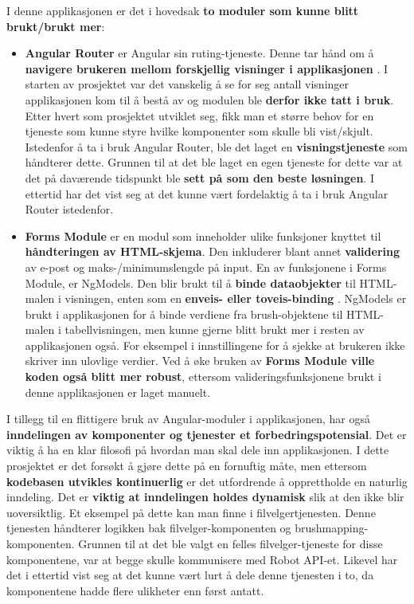 I denne applikasjonen er det i hovedsak \textbf{to moduler som kunne blitt brukt/brukt mer}: 

\begin{itemize}
    \item \textbf{Angular Router} er Angular sin ruting-tjeneste. Denne tar hånd om å \textbf{navigere brukeren mellom forskjellig visninger i applikasjonen} \cite{angularRouter}. I starten av prosjektet var det vanskelig å se for seg antall visninger applikasjonen kom til å bestå av og modulen ble \textbf{derfor ikke tatt i bruk}. Etter hvert som prosjektet utviklet seg, fikk man et større behov for en tjeneste som kunne styre hvilke komponenter som skulle bli vist/skjult. Istedenfor å ta i bruk Angular Router, ble det laget en \textbf{visningstjeneste} som håndterer dette. Grunnen til at det ble laget en egen tjeneste for dette var at det på daværende tidspunkt ble \textbf{sett på som den beste løsningen}. I ettertid har det vist seg at det kunne vært fordelaktig å ta i bruk Angular Router istedenfor. 
    
    \item \textbf{Forms Module} er en modul som inneholder ulike funksjoner knyttet til \textbf{håndteringen av HTML-skjema}. Den inkluderer blant annet \textbf{validering} av e-post og maks-/minimumslengde på input. En av funksjonene i Forms Module, er NgModels. Den blir brukt til å \textbf{binde dataobjekter} til HTML-malen i visningen, enten som en \textbf{enveis- eller toveis-binding} \cite{formsModule}. NgModels er brukt i applikasjonen for å binde verdiene fra brush-objektene til HTML-malen i tabellvisningen, men kunne gjerne blitt brukt mer i resten av applikasjonen også. For eksempel i innstillingene for å sjekke at brukeren ikke skriver inn ulovlige verdier. Ved å øke bruken av \textbf{Forms Module ville koden også blitt mer robust}, ettersom valideringsfunksjonene brukt i denne applikasjonen er laget manuelt. 
\end{itemize}

\noindent I tillegg til en flittigere bruk av Angular-moduler i applikasjonen, har også \textbf{inndelingen av komponenter og tjenester et forbedringspotensial}. Det er viktig å ha en klar filosofi på hvordan man skal dele inn applikasjonen. I dette prosjektet er det forsøkt å gjøre dette på en fornuftig måte, men ettersom \textbf{kodebasen utvikles kontinuerlig} er det utfordrende å opprettholde en naturlig inndeling. Det er \textbf{viktig at inndelingen holdes dynamisk} slik at den ikke blir uoversiktlig. Et eksempel på dette kan man finne i filvelgertjenesten. Denne tjenesten håndterer logikken bak filvelger-komponenten og brushmapping-komponenten. Grunnen til at det ble valgt en felles filvelger-tjeneste for disse komponentene, var at begge skulle kommunisere med Robot API-et. Likevel har det i ettertid vist seg at det kunne vært lurt å dele denne tjenesten i to, da komponentene hadde flere ulikheter enn først antatt.

